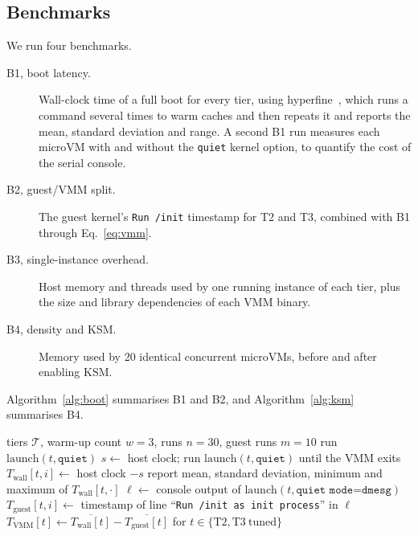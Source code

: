 \documentclass[pdflatex,sn-mathphys-num]{sn-jnl}%
\begin{document}
\subsection{Benchmarks}

We run four benchmarks.
\begin{description}
\item[B1, boot latency.] Wall-clock time of a full boot for every tier, using hyperfine~\cite{hyperfine}, which runs a command several times to warm caches and then repeats it and reports the mean, standard deviation and range. A second B1 run measures each microVM with and without the \texttt{quiet} kernel option, to quantify the cost of the serial console.
\item[B2, guest/VMM split.] The guest kernel's \texttt{Run /init} timestamp for T2 and T3, combined with B1 through Eq.~\eqref{eq:vmm}.
\item[B3, single-instance overhead.] Host memory and threads used by one running instance of each tier, plus the size and library dependencies of each VMM binary.
\item[B4, density and KSM.] Memory used by 20 identical concurrent microVMs, before and after enabling KSM.
\end{description}

Algorithm~\ref{alg:boot} summarises B1 and B2, and Algorithm~\ref{alg:ksm} summarises B4.

\begin{algorithm}[ht]
\caption{Boot latency and guest/VMM decomposition (B1, B2)}\label{alg:boot}
\begin{algorithmic}[1]
\Require tiers $\mathcal{T}$, warm-up count $w=3$, runs $n=30$, guest runs $m=10$
   \State run $\mathrm{launch}(t,\texttt{quiet})$ 
  \EndFor
    \State $s \gets$ host clock; run $\mathrm{launch}(t,\texttt{quiet})$ until the VMM exits
    \State $T_{\mathrm{wall}}[t,i] \gets$ host clock $- s$
  \EndFor
  \State report mean, standard deviation, minimum and maximum of $T_{\mathrm{wall}}[t,\cdot]$
\EndFor
{} 
    \State $\ell \gets$ console output of $\mathrm{launch}(t,\texttt{quiet mode=dmesg})$
    \State $T_{\mathrm{guest}}[t,i] \gets$ timestamp of line ``\texttt{Run /init as init process}'' in $\ell$
  \EndFor
\EndFor
\State $T_{\mathrm{VMM}}[t] \gets \overline{T_{\mathrm{wall}}[t]} - \overline{T_{\mathrm{guest}}[t]}$ for $t \in \{\mathrm{T2},\mathrm{T3\ tuned}\}$
\end{algorithmic}
\end{algorithm}
\end{document}
